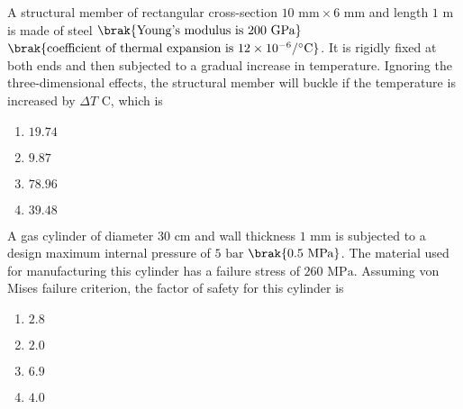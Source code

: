 \iffalse
                       
                        
                        
                        
                    
                        \author{AI24BTECH11006 - Bugada Roopansha}
                        \section{AE}
                        \chapter{2014}
                        \fi
 
    \item A structural member of rectangular cross-section $10 \text{ mm} \times 6 \text{ mm}$ and length $1 \text{ m}$ is made of steel $\brak{\text{Young's modulus is } 200 \text{ GPa}}$ $\brak{\text{coefficient of thermal expansion is } 12 \times 10^{-6}/^{\circ}\text{C}}$. It is rigidly fixed at both ends and then subjected to a gradual increase in temperature. Ignoring the three-dimensional effects, the structural member will buckle if the temperature is increased by $\Delta T$ \degree C, which is
	   





	    \begin{enumerate}
        \item $19.74$
        \item $9.87$
        \item $78.96$
        \item $39.48$
    \end{enumerate}


    \item A gas cylinder  of diameter $30 \text{ cm}$ and wall thickness $1 \text{ mm}$ is subjected to a design maximum internal pressure of $5 \text{ bar}$ $\brak{0.5 \text{ MPa}}$. The material used for manufacturing this cylinder has a failure stress of $260 \text{ MPa}$. Assuming von Mises failure criterion, the factor of safety  for this cylinder is
    \begin{enumerate}
        \item $2.8$
        \item $2.0$
        \item $6.9$
        \item $4.0$
    \end{enumerate}

